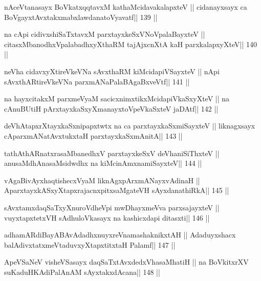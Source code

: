 \begin{shl}
nAceVtanasayx BoVkatxqqtavxM kathaMcidavakalapxteV ||
cidanayxsayx ca BoVgayxtAvxtakxmabxlawdanatoVyavatf\hfill || 139 ||
\end{shl}

\begin{shl}
na cApi cidivxshiSaTxtavxM parxtayxkeSxVNoVpalaBayxteV ||
citasxMbanodhxVpalabadhxyXthaRM tajAjxcnXtA kaH parxkalapxyXteV\hfill || 140 ||
\end{shl}

\begin{shl}
neVha cidavxyXtireVkeVNa sAvxthaRM kiMcidapiVSayxteV ||
nApi sAvxthARtireVkeVNa parxmANaPalaBAgaBxveVtf\hfill || 141 ||
\end{shl}

\begin{shl}
na hayxcitakxM parxmeVyaM sacicxnimxtikxMcidapiVkaSxyXteV ||
na cAnuBUtiH pArxtayxkaSxyXmanayxtoV\s peVkaSxteV jaDAtf\hfill || 142 ||
\end{shl}

\begin{shl}
deVhAtapxrXtayxkaSxnipapxtwtx na ca parxtayxkaSxmiSayxteV ||
liknagxsayx cAparxmANatAvxtukxtaH  parxtayxkaSxmAnitA\hfill || 143 ||
\end{shl}

\begin{shl}
tathA\s thARnatxrasaMbanedhxV parxtayxkeSxV deVhaniSiThxteV ||
anusaMdhAnasaMsidwdhx na kiMcinAmxnamiSayxteV\hfill || 144 ||
\end{shl}

\begin{shl}
vAgaBivAyxhaqtishecxVyaM liknAgxpArxmANayxvAdinaH ||
AparxtayxkASxyXtapxrajacnxpitxsaMgateVH sAyxdanathiRkA\hfill || 145 ||
\end{shl}

\begin{shl}
sAvxtamxdaqSaTxyXnuroVdheV\s pi mwDhayxmeVva parxsajayxteV ||
vuyxtapxtetxVH sAdhuloVkasayx na kashicxdapi ditasxti\hfill || 146 ||
\end{shl}

\begin{shl}
adhamARdiBayABAvAdadhxnuyxreVnamashaknikxtAH ||
Adaduyxshacx balAdivxtatxmeVtaduvxyXtapxtitxtaH Palamf\hfill || 147 ||
\end{shl}

\begin{shl}
ApeVSaNeV visheVSasayx daqSaTxtAvxdedxVhasaMhatiH ||
na BoVkitxrXV suKaduHKAdiPalAnAM sAyxtakxdAcana\hfill || 148 ||
\end{shl}

